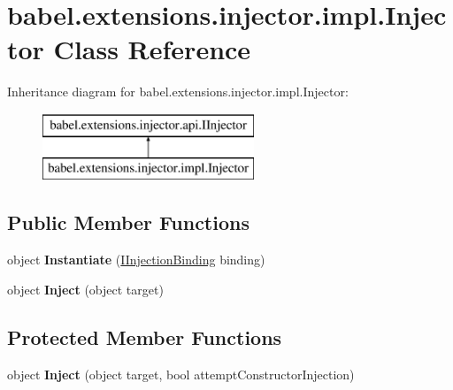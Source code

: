 \hypertarget{classbabel_1_1extensions_1_1injector_1_1impl_1_1_injector}{\section{babel.\-extensions.\-injector.\-impl.\-Injector Class Reference}
\label{classbabel_1_1extensions_1_1injector_1_1impl_1_1_injector}
}
Inheritance diagram for babel.\-extensions.\-injector.\-impl.\-Injector\-:\begin{figure}[H]
\begin{center}
\leavevmode
\includegraphics[height=2.000000cm]{classbabel_1_1extensions_1_1injector_1_1impl_1_1_injector}
\end{center}
\end{figure}
\subsection*{Public Member Functions}
\begin{DoxyCompactItemize}
\item 
\hypertarget{classbabel_1_1extensions_1_1injector_1_1impl_1_1_injector_aaa2d1cd0558e78d8ce68764bea0425ca}{object {\bfseries Instantiate} (\hyperlink{interfacebabel_1_1extensions_1_1injector_1_1api_1_1_i_injection_binding}{I\-Injection\-Binding} binding)}\label{classbabel_1_1extensions_1_1injector_1_1impl_1_1_injector_aaa2d1cd0558e78d8ce68764bea0425ca}

\item 
\hypertarget{classbabel_1_1extensions_1_1injector_1_1impl_1_1_injector_ae60ff4d1aa5d5cd5db0d8d13aa7f67db}{object {\bfseries Inject} (object target)}\label{classbabel_1_1extensions_1_1injector_1_1impl_1_1_injector_ae60ff4d1aa5d5cd5db0d8d13aa7f67db}

\end{DoxyCompactItemize}
\subsection*{Protected Member Functions}
\begin{DoxyCompactItemize}
\item 
\hypertarget{classbabel_1_1extensions_1_1injector_1_1impl_1_1_injector_a09b84ded24dfaa80375c541dd8dcb821}{object {\bfseries Inject} (object target, bool attempt\-Constructor\-Injection)}\label{classbabel_1_1extensions_1_1injector_1_1impl_1_1_injector_a09b84ded24dfaa80375c541dd8dcb821}

\end{DoxyCompactItemize}
